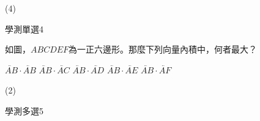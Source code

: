 \begin{QUESTIONS}
\begin{QUESTION}
\begin{QBODY}
        \end{QBODY}
        \begin{QFROMS}
        \end{QFROMS}
        \begin{QTAGS}\end{QTAGS}
        \begin{QANS}
            (4)
        \end{QANS}
        \begin{QSOLLIST}
        \end{QSOLLIST}
        \begin{QEMPTYSPACE}
        \end{QEMPTYSPACE}
    \end{QUESTION}
    \begin{QUESTION}
        \begin{ExamInfo}{87}{學測}{單選}{4}
        \end{ExamInfo}
        \begin{ExamAnsRateInfo}{}{}{}{}
        \end{ExamAnsRateInfo}
        \begin{QBODY}
            如圖，$ABCDEF$為一正六邊形。那麼下列向量內積中，何者最大？
            \begin{QOPS}
                \QOP $\lvec{AB}\cdot\lvec{AB}$
                \QOP $\lvec{AB}\cdot\lvec{AC}$
                \QOP $\lvec{AB}\cdot\lvec{AD}$
                \QOP $\lvec{AB}\cdot\lvec{AE}$
                \QOP $\lvec{AB}\cdot\lvec{AF}$
            \end{QOPS}
        \end{QBODY}
        \begin{QFROMS}
        \end{QFROMS}
        \begin{QTAGS}\end{QTAGS}
        \begin{QANS}
            (2)
        \end{QANS}
        \begin{QSOLLIST}
        \end{QSOLLIST}
        \begin{QEMPTYSPACE}
        \end{QEMPTYSPACE}
    \end{QUESTION}
\end{QUESTIONS}\begin{QUESTIONS}
    \begin{QUESTION}
        \begin{ExamInfo}{87}{學測}{多選}{5}

\end{ExamInfo}
\end{QUESTION}
\end{QUESTIONS}
